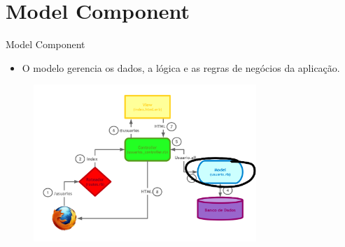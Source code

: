 \section{Model Component}
\begin{frame}[t, fragile]{Model Component}
	\begin{itemize}
		\item O modelo gerencia os \alert{dados}, a \alert{lógica} e as \alert{regras de negócios} da aplicação.
	\end{itemize}
	\begin{figure}[h!]
		\centering
		\includegraphics[width=0.75\textwidth]{imagens/mvc-2.png}
	\end{figure}
\end{frame}